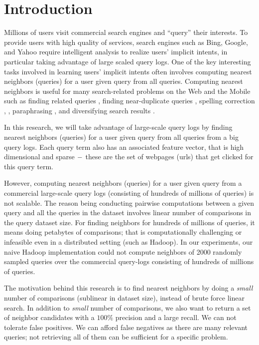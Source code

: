 
 \section{Introduction}
Millions of users visit commercial search engines and ``query'' 
their interests. To provide users with high quality of services, 
search engines such as Bing, Google, and Yahoo require
intelligent analysis to realize users' implicit intents, in particular taking
advantage of large scaled query logs.  One of the key
interesting tasks involved in learning users' implicit intents often involves 
computing nearest neighbors (queries) for a user given query from all queries. 
Computing nearest neighbors is useful for 
many search-related problems on the Web and the Mobile such as 
finding related queries \cite{Jones06WWW,Jain11SIGIR,Song12WSDM}, 
finding near-duplicate queries \cite{}, spelling correction \cite{},  
, paraphrasing \cite{petrovicNAACL12,ganitkevitch13Paraphrase}, 
and diversifying search results \cite{Song11SIGIR}.  

In this research,  we will take advantage of large-scale query logs 
by finding nearest neighbors (queries) for a user given query from all 
queries from a big query logs. Each query term also has an associated feature vector, that is
 high dimensional and sparse $\--$ these are the set of webpages (urls) that get clicked for this query term.

However, computing nearest neighbors (queries) for a user given query 
from a commercial large-scale query logs (consisting of hundreds of millions of  queries) is not scalable. 
The reason being conducting pairwise computations between a given query and all the queries in the dataset involves 
linear number of comparisons in the query dataset size. For finding neighbors for hundreds of millions of queries, 
it means doing petabytes of comparisons; that is computationally challenging or infeasible even in a distributed setting (such as Hadoop). 
In our experiments, our naive Hadoop implementation could not compute neighbors of 
2000 randomly sampled queries over the commercial query-logs 
consisting of hundreds of millions of queries.  

The motivation behind this research is to find nearest neighbors by doing a 
\emph{small} number of comparisons (sublinear in dataset size), instead of brute force linear search. 
In addition to \emph{small} number of comparisons, we also want to 
return a set of neighbor candidates with a $100\%$ precision and a large recall. 
We can not tolerate false positives. We can afford false negatives as there 
are many relevant queries; not retrieving all of them can be sufficient for a specific problem. 

